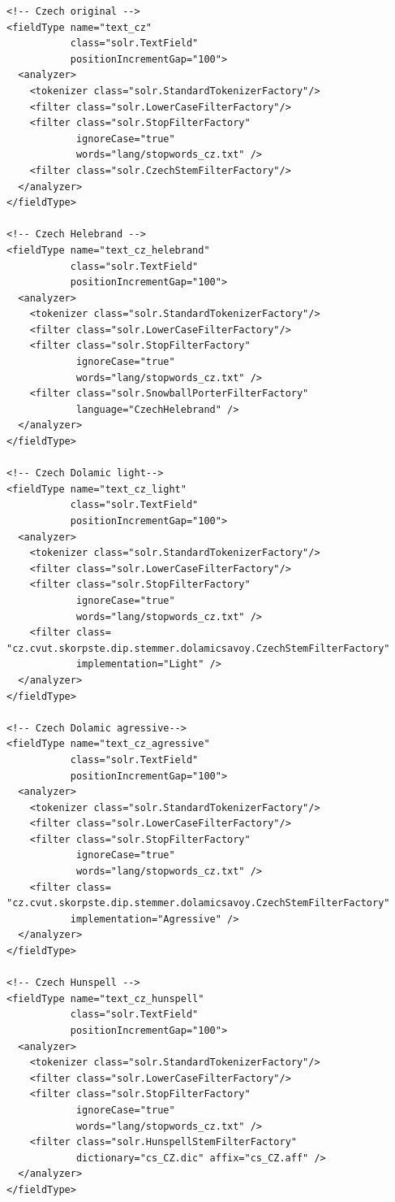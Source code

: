 \begin{verbatim}
<!-- Czech original -->
<fieldType name="text_cz" 
           class="solr.TextField" 
           positionIncrementGap="100">
  <analyzer> 
    <tokenizer class="solr.StandardTokenizerFactory"/>
    <filter class="solr.LowerCaseFilterFactory"/>
    <filter class="solr.StopFilterFactory" 
            ignoreCase="true" 
            words="lang/stopwords_cz.txt" />
    <filter class="solr.CzechStemFilterFactory"/>       
  </analyzer>
</fieldType>

<!-- Czech Helebrand -->
<fieldType name="text_cz_helebrand" 
           class="solr.TextField" 
           positionIncrementGap="100">
  <analyzer> 
    <tokenizer class="solr.StandardTokenizerFactory"/>
    <filter class="solr.LowerCaseFilterFactory"/>
    <filter class="solr.StopFilterFactory" 
            ignoreCase="true" 
            words="lang/stopwords_cz.txt" />
    <filter class="solr.SnowballPorterFilterFactory" 
            language="CzechHelebrand" />       
  </analyzer>
</fieldType>

<!-- Czech Dolamic light-->
<fieldType name="text_cz_light" 
           class="solr.TextField"
           positionIncrementGap="100">
  <analyzer> 
    <tokenizer class="solr.StandardTokenizerFactory"/>
    <filter class="solr.LowerCaseFilterFactory"/>
    <filter class="solr.StopFilterFactory" 
            ignoreCase="true" 
            words="lang/stopwords_cz.txt" />
    <filter class=
"cz.cvut.skorpste.dip.stemmer.dolamicsavoy.CzechStemFilterFactory" 
            implementation="Light" />       
  </analyzer>
</fieldType>

<!-- Czech Dolamic agressive-->
<fieldType name="text_cz_agressive" 
           class="solr.TextField" 
           positionIncrementGap="100">
  <analyzer> 
    <tokenizer class="solr.StandardTokenizerFactory"/>
    <filter class="solr.LowerCaseFilterFactory"/>
    <filter class="solr.StopFilterFactory"
            ignoreCase="true" 
            words="lang/stopwords_cz.txt" />
    <filter class=
"cz.cvut.skorpste.dip.stemmer.dolamicsavoy.CzechStemFilterFactory"
       	   implementation="Agressive" />       
  </analyzer>
</fieldType>

<!-- Czech Hunspell -->
<fieldType name="text_cz_hunspell" 
           class="solr.TextField" 
           positionIncrementGap="100">
  <analyzer> 
    <tokenizer class="solr.StandardTokenizerFactory"/>
    <filter class="solr.LowerCaseFilterFactory"/>
    <filter class="solr.StopFilterFactory" 
            ignoreCase="true" 
            words="lang/stopwords_cz.txt" />
    <filter class="solr.HunspellStemFilterFactory" 
            dictionary="cs_CZ.dic" affix="cs_CZ.aff" />       
  </analyzer>
</fieldType>
\end{verbatim}

